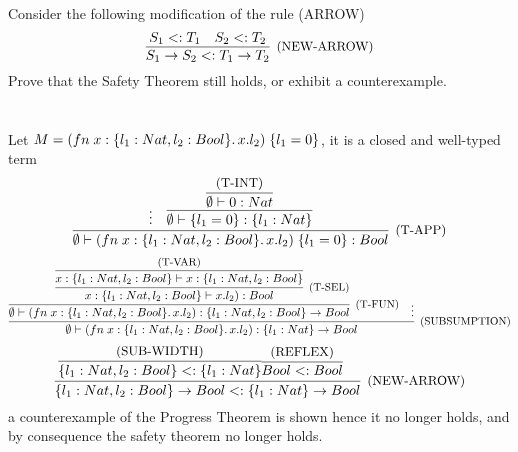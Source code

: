 \subsection{}

Consider the following modification of the rule (ARROW)
\[
	\infer[\text{\small{(NEW-ARROW)}}]
	{S_1 \to S_2 <: T_1 \to T_2}
	{
		S_1 <: T_1 &
		S_2 <: T_2
	}
\]
Prove that the Safety Theorem still holds, or exhibit a counterexample.\\~\\
\\
Let $M = (fn\;x:\{l_1: Nat, l_2: Bool\}.\,x.l_2)\;\{l_1 = 0\}$, it is a closed and well-typed term
\[
	\infer[\text{\small{(T-APP)}}]
	{\emptyset \vdash \APP{(\FN{x:\TREC{l_1: Nat, l_2: Bool}}{\SEL{x}{l_2}})}{\REC{l_1 = 0}}: Bool}
	{
		\vdots &
		\infer{\emptyset \vdash \REC{l_1 = 0}: \TREC{l_1: Nat}}
		{ \infer{ \emptyset \vdash 0: Nat }{\text{\small{(T-INT)}}} }
	}
\]
\[
	\infer[\text{\small{(SUBSUMPTION)}}]
	{\emptyset \vdash (\FN{x:\TREC{l_1: Nat, l_2: Bool}}{\SEL{x}{l_2}}): \TREC{l_1: Nat} \to Bool}
	{
		\infer[\text{\small{(T-FUN)}}]
		{\emptyset \vdash (\FN{x:\TREC{l_1: Nat, l_2: Bool}}{\SEL{x}{l_2}}): \TREC{l_1: Nat, l_2: Bool} \to Bool}
		{
			\infer[\text{\small{(T-SEL)}}]
			{ x: \TREC{l_1: Nat, l_2: Bool} \vdash {\SEL{x}{l_2}}): Bool }
			{
				\infer
				{ x: \TREC{l_1: Nat, l_2: Bool} \vdash x: \TREC{l_1: Nat, l_2: Bool} }
				{\text{\small{(T-VAR)}}}
			}
		}
		&
		\vdots
	}
\]
\[
	\infer[\text{\small{(NEW-ARROW)}}]
	{\TREC{l_1: Nat, l_2: Bool} \to Bool <: \TREC{l_1: Nat} \to Bool}
	{
		\infer{\TREC{l_1: Nat, l_2: Bool} <: \TREC{l_1: Nat}}{\text{\small{(SUB-WIDTH)}}}
		\infer{Bool <: Bool}{\text{\small{(REFLEX)}}} &
	}
\]
a counterexample of the Progress Theorem is shown hence it no longer holds, and by consequence
the safety theorem no longer holds.

